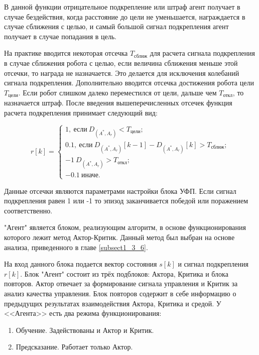 \noindent В данной функции отрицательное подкрепление или штраф агент получает в случае бездействия, когда расстояние до цели не уменьшается, награждается в случае сближения с целью, и самый большой сигнал подкрепления агент получает в случае попадания в цель.

На практике вводится некоторая отсечка $ T_{\text{сближ}} $ для расчета сигнала подкрепления в случае сближения робота с целью, если величина сближения  меньше этой отсечки, то награда не назначается. Это делается для исключения колебаний сигнала подкрепления. Дополнительно вводится отсечка достижения робота цели $ T_{\text{цели}} $. Если робот слишком далеко переместился от цели, дальше чем $ T_{\text{откл}} $, то назначается штраф. После введения вышеперечисленных отсечек функция расчета подкрепления принимает следующий вид:

$$
r[k] = \begin{cases}
1, \: \text{если} \: D_{(A^*, A_r)} < T_{\text{цели}}; \\
0.1, \: \text{если} \: D_{(A^*, A_r)}[k-1] - D_{(A^*, A_r)}[k] > T_{\text{сближ}}; \\
-1 \: D_{(A^*, A_r)} > T_{\text{откл}};\\
-0.1 \: \text{иначе}.
\end{cases}
$$

\noindent Данные отсечки являются параметрами настройки блока УФП. Если сигнал подкрепления равен 1 или -1 то эпизод заканчивается победой или поражением соответственно.

"Агент" является блоком, реализующим алгоритм, в основе функционирования которого лежит метод Актор-Критик. Данный метод был выбран на основе анализа, приведенного в главе \ref{subsect1_3_6}.

На вход данного блока подается вектор состояния $s[k]$ и сигнал подкрепления $r[k]$. Блок "Агент" состоит из трёх подблоков: Актора, Критика и блока повторов. Актор отвечает за формирование сигнала управления и Критик за анализ качества управления. Блок повторов содержит в себе информацию о предыдущих результатах взаимодействия Актора, Критика и средой. У <<Агента>> есть два режима функционирования:
\begin{enumerate}
	\item Обучение. Задействованы и Актор и Критик.
	\item Предсказание. Работает только Актор.
\end{enumerate} 

